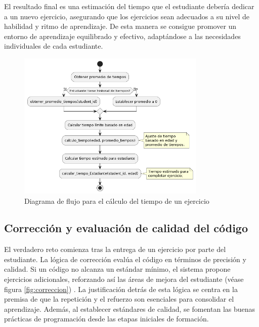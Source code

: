 El resultado final es una estimación del tiempo que el estudiante debería dedicar a un nuevo ejercicio, asegurando que los ejercicios sean adecuados a su nivel de habilidad y ritmo de aprendizaje. De esta manera se consigue promover un entorno de aprendizaje equilibrado y efectivo, adaptándose a las necesidades individuales de cada estudiante.

\begin{figure}[H]
\centering
\includegraphics[width=0.8\textwidth]{imagenes/calculotiempo.png}
\caption{Diagrama de flujo para el cálculo del tiempo de un ejercicio}
\label{fig:calculotiempo}
\end{figure}

\subsection{Corrección y evaluación de calidad del código}

El verdadero reto comienza tras la entrega de un ejercicio por parte del estudiante. La lógica de corrección evalúa el código en términos de precisión y calidad. Si un código no alcanza un estándar mínimo, el sistema propone ejercicios adicionales, reforzando así las áreas de mejora del estudiante (véase figura \ref{fig:correccion}) . La justificación detrás de esta lógica se centra en la premisa de que la repetición y el refuerzo son esenciales para consolidar el aprendizaje. Además, al establecer estándares de calidad, se fomentan las buenas prácticas de programación desde las etapas iniciales de formación.

